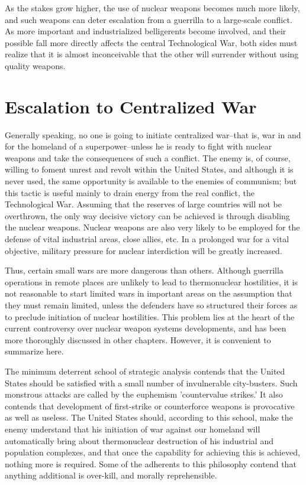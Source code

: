 As the stakes grow higher, the use of nuclear weapons becomes much more likely, and such weapons can deter escalation from a guerrilla to a large-scale conflict. As more important and industrialized belligerents become involved, and their possible fall more directly affects the central Technological War, both sides must realize that it is almost inconceivable that the other will surrender without using quality weapons.

\section{Escalation to Centralized War}
Generally speaking, no one is going to initiate centralized war--that is, war in and for the homeland of a superpower--unless he is ready to fight with nuclear weapons and take the consequences of such a conflict. The enemy is, of course, willing to foment unrest and revolt within the United States, and although it is never used, the same opportunity is available to the enemies of communism; but this tactic is useful mainly to drain energy from the real conflict, the Technological War. Assuming that the reserves of large countries will not be overthrown, the only way decisive victory can be achieved is through disabling the nuclear weapons. Nuclear weapons are also very likely to be employed for the defense of vital industrial areas, close allies, etc. In a prolonged war for a vital objective, military pressure for nuclear interdiction will be greatly increased.

Thus, certain small wars are more dangerous than others. Although guerrilla operations in remote places are unlikely to lead to thermonuclear hostilities, it is not reasonable to start limited wars in important areas on the assumption that they must remain limited, unless the defenders have so structured their forces as to preclude initiation of nuclear hostilities. This problem lies at the heart of the current controversy over nuclear weapon systems developments, and has been more thoroughly discussed in other chapters. However, it is convenient to summarize here.

The minimum deterrent school of strategic analysis contends that the United States should be satisfied with a small number of invulnerable city-busters. Such monstrous attacks are called by the euphemism 'countervalue strikes.' It also contends that development of first-strike or counterforce weapons is provocative as well as useless. The United States should, according to this school, make the enemy understand that his initiation of war against our homeland will automatically bring about thermonuclear destruction of his industrial and population complexes, and that once the capability for achieving this is achieved, nothing more is required. Some of the adherents to this philosophy contend that anything additional is over-kill, and morally reprehensible.

